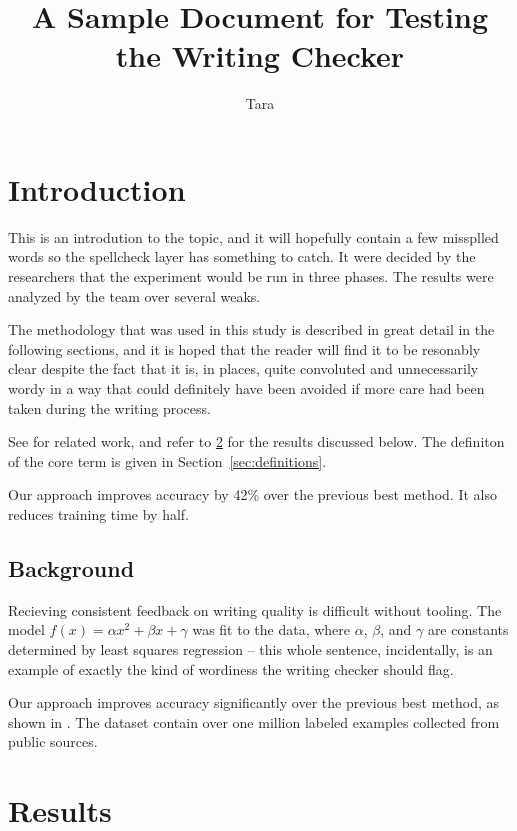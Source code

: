 \documentclass{article}
\title{A Sample Document for Testing the Writing Checker}
\author{Tara}
\begin{document}
\maketitle

\section{Introduction}

This is an introdution to the topic, and it will hopefully contain a few
missplled words so the spellcheck layer has something to catch. It were
decided by the researchers that the experiment would be run in three
phases. The results were analyzed by the team over several weaks.

The methodology that was used in this study is described in great detail
in the following sections, and it is hoped that the reader will find it
to be resonably clear despite the fact that it is, in places, quite
convoluted and unnecessarily wordy in a way that could definitely have
been avoided if more care had been taken during the writing process.

See \cite{smith2020} for related work, and refer to \ref{sec:results}
for the results discussed below. The definiton of the core term is given
in Section~\ref{sec:definitions}.

Our approach improves accuracy by 42\% over the previous best method.
It also reduces training time by half.

\subsection{Background}

Recieving consistent feedback on writing quality is difficult without
tooling. The model $f(x) = \alpha x^2 + \beta x + \gamma$ was fit to the
data, where $\alpha$, $\beta$, and $\gamma$ are constants determined by
least squares regression -- this whole sentence, incidentally, is an
example of exactly the kind of wordiness the writing checker should
flag.

Our approach improves accuracy significantly over the previous best
method, as shown in \cite{smith2020}. The dataset contain over one
million labeled examples collected from public sources.

\section{Results}
\label{sec:results}
\end{document}
